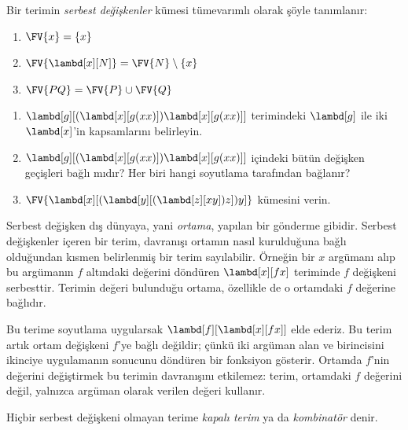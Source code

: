 \documentclass[../../../include/open-logic-section]{subfiles}
\begin{document}
\begin{defn} 
  Bir terimin \emph{serbest değişkenler} kümesi tümevarımlı olarak şöyle
  tanımlanır:
  \begin{enumerate}
    \item $\FV{x} = \{x\}$ 
    \item $\FV{\lambd[x][N]} = \FV{N} \setminus \{x\}$ 
    \item $\FV{PQ} = \FV{P} \cup \FV{Q}$ 
  \end{enumerate}
\end{defn}

\begin{prob}
  \begin{enumerate}
  \item $\lambd[g][(\lambd[x][g (x x)]) \lambd[x][g (x x)]]$ terimindeki
    $\lambd[g]$ ile iki $\lambd[x]$'in kapsamlarını belirleyin.
  \item $\lambd[g][(\lambd[x][g (x x)]) \lambd[x][g (x x)]]$ içindeki
    bütün değişken geçişleri bağlı mıdır? Her biri hangi soyutlama tarafından
    bağlanır?
    \item $\FV{\lambd[x][(\lambd[y][(\lambd[z][x y]) z]) y]}$ kümesini
    verin.
  \end{enumerate}
\end{prob}

\begin{explain}
Serbest değişken dış dünyaya, yani \emph{ortama}, yapılan bir gönderme
gibidir. Serbest değişkenler içeren bir terim, davranışı ortamın nasıl
kurulduğuna bağlı olduğundan kısmen belirlenmiş bir terim sayılabilir.
Örneğin bir $x$ argümanı alıp bu argümanın $f$ altındaki değerini döndüren
$\lambd[x][f x]$ teriminde $f$ değişkeni serbesttir. Terimin değeri bulunduğu
ortama, özellikle de o ortamdaki $f$ değerine bağlıdır.

Bu terime soyutlama uygularsak $\lambd[f][\lambd[x][f x]]$ elde ederiz. Bu
terim artık ortam değişkeni $f$'ye bağlı değildir; çünkü iki argüman alan ve
birincisini ikinciye uygulamanın sonucunu döndüren bir fonksiyon gösterir.
Ortamda $f$'nin değerini değiştirmek bu terimin davranışını etkilemez: terim,
ortamdaki $f$ değerini değil, yalnızca argüman olarak verilen değeri kullanır.
\end{explain}

\begin{defn}
  Hiçbir serbest değişkeni olmayan terime \emph{kapalı terim} ya da
  \emph{kombinatör} denir.
\end{defn}
\end{document}
